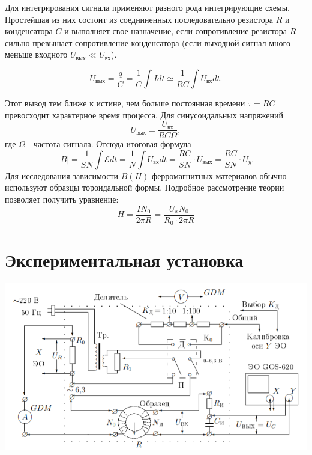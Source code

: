 \documentclass[a4paper]{article}%
\begin{document}
Для интегрирования сигнала применяют разного рода интегрирующие схемы. Простейшая из них состоит из соедниненных последовательно резистора $R$ и конденсатора $C$ и выполняет свое назначение, если сопротивление резистора $R$ сильно превышает сопротивление конденсатора (если выходной сигнал много меньше входного $U_{\textit{вых}} \ll U_{\textit{вх}}$). 

\begin{equation}
U_{\textit{вых}} = \frac{q}{C} =\frac{1}{C} \int Idt \simeq \frac{1}{RC} \int U_{\textit{вх}} dt.
\end{equation}

Этот вывод тем ближе к истине, чем больше постоянная времени $\tau = RC$ превосходит характерное время процесса. Для синусоидальных напряжений 
\begin{equation}
U_{\textit{вых}} = \frac{U_{\textit{вх}}}{RC\Omega},
\end{equation}
где $\Omega$ - частота сигнала. Отсюда итоговая формула
\begin{equation}
|B| = \frac {1}{SN} \int \mathscr{E}dt = \frac {1}{N} \int U_{\textit{вх}} dt = \frac{RC}{SN} \cdot U_{\textit{вых}} = \frac{RC}{SN} \cdot U_y.
\end{equation}
Для исследования зависимости $B(H)$ ферромагнитных материалов обычно используют образцы тороидальной формы. Подробное рассмотрение теории позволяет получить уравнение:
\begin{equation}
H = \frac{IN_0}{2\pi R} = \frac{U_x N_0}{R_0\cdot 2\pi R}
\end{equation}

\section*{Экспериментальная установка}
	\begin{center}
	\includegraphics[width=\textwidth]{sch}
\end{center}
\end{document}
